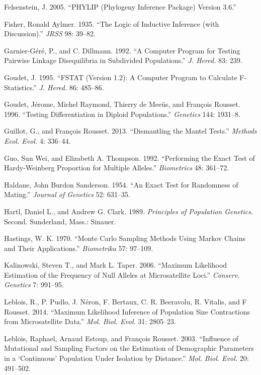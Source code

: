 \documentclass[12pt,]{book}
\theoremstyle{definition}
\theoremstyle{definition}
\theoremstyle{definition}
\theoremstyle{remark}
\begin{document}
\hypertarget{ref-Phylip}{}
Felsenstein, J. 2005. ``PHYLIP (Phylogeny Inference Package) Version
3.6.''

\hypertarget{ref-Fisher35}{}
Fisher, Ronald Aylmer. 1935. ``The Logic of Inductive Inference (with
Discussion).'' \emph{JRSS} 98: 39--82.

\hypertarget{ref-GarnierD92}{}
Garnier-Géré, P., and C. Dillmann. 1992. ``A Computer Program for
Testing Pairwise Linkage Disequilibria in Subdivided Populations.''
\emph{J. Hered.} 83: 239.

\hypertarget{ref-Goudet95}{}
Goudet, J. 1995. ``FSTAT (Version 1.2): A Computer Program to Calculate
F-Statistics.'' \emph{J. Hered.} 86: 485--86.

\hypertarget{ref-GoudetRMR96}{}
Goudet, Jérome, Michel Raymond, Thierry de Meeüs, and François Rousset.
1996. ``Testing Differentiation in Diploid Populations.''
\emph{Genetics} 144: 1931--8.

\hypertarget{ref-GuillotR13}{}
Guillot, G., and François Rousset. 2013. ``Dismantling the Mantel
Tests.'' \emph{Methods Ecol. Evol.} 4: 336--44.

\hypertarget{ref-GuoT92}{}
Guo, Sun Wei, and Elizabeth A. Thompson. 1992. ``Performing the Exact
Test of Hardy-Weinberg Proportion for Multiple Alleles.''
\emph{Biometrics} 48: 361--72.

\hypertarget{ref-Haldane54}{}
Haldane, John Burdon Sanderson. 1954. ``An Exact Test for Randomness of
Mating.'' \emph{Journal of Genetics} 52: 631--35.

\hypertarget{ref-HartlC2e}{}
Hartl, Daniel L., and Andrew G. Clark. 1989. \emph{Principles of
Population Genetics}. Second. Sunderland, Mass.: Sinauer.

\hypertarget{ref-Hastings70}{}
Hastings, W. K. 1970. ``Monte Carlo Sampling Methods Using Markov Chains
and Their Applications.'' \emph{Biometrika} 57: 97--109.

\hypertarget{ref-KalinowskiT06}{}
Kalinowski, Steven T., and Mark L. Taper. 2006. ``Maximum Likelihood
Estimation of the Frequency of Null Alleles at Microsatellite Loci.''
\emph{Conserv. Genetics} 7: 991--95.

\hypertarget{ref-LebloisX14}{}
Leblois, R., P. Pudlo, J. Néron, F. Bertaux, C. R. Beeravolu, R.
Vitalis, and F Rousset. 2014. ``Maximum Likelihood Inference of
Population Size Contractions from Microsatellite Data.'' \emph{Mol.
Biol. Evol.} 31: 2805--23.

\hypertarget{ref-LebloisER03}{}
Leblois, Raphael, Arnaud Estoup, and François Rousset. 2003. ``Influence
of Mutational and Sampling Factors on the Estimation of Demographic
Parameters in a `Continuous' Population Under Isolation by Distance.''
\emph{Mol. Biol. Evol.} 20: 491--502.
\end{document}
